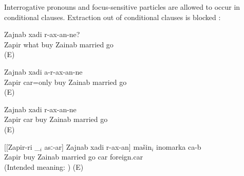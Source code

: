 Interrogative pronouns  and focus-sensitive particles  are allowed to occur in conditional clauses. Extraction out of conditional clauses is blocked :
%
\begin{exe}
	\ex	\label{ex:Zapir, Zainab, and Heloise}
	\begin{xlist}
		\ex	\label{ex:If Zapir buys what Zainab will marry him}
			Zajnab	xadi	r-ax-an-ne?\\
			Zapir	what buy	Zainab	married	go\\
		\glt	{} (E) 

		\ex	\label{ex:If Zapir buys only a car, Zainab will not marry him}
		\gll	[Zapir-ri	mašin=cun	asː-ar]	Zajnab	xadi	a-r-ax-an-ne\\
			Zapir	car=only buy	Zainab	married	go\\
		\glt	{} (E) 

		\ex	\label{ex:If Zapir buys a foreign car, Zajnab will marry him}
			Zajnab	xadi	r-ax-an-ne\\
			Zapir	car buy	Zainab	married	go\\
		\glt	{} (E) 

		\ex	\label{ex:The car that if Zapir buys it Zainab will marry him is a foreign car}
		\gll	{*}	[[Zapir-ri	\_$_{i}$	asː-ar]	Zajnab	xadi	r-ax-an]	mašin$_{i}$	inomarka	ca-b\\
			{}	Zapir		buy	Zainab	married	go	car	foreign.car	\\
		\glt	(Intended meaning: ) (E) 
	\end{xlist}
\end{exe}

